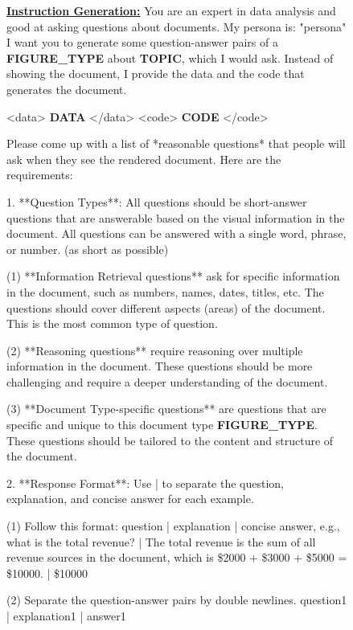 \begin{figure}[!h]
    \centering
    \begin{center}

\begin{tcolorbox} [top=3pt,bottom=3pt, left=3pt, right=3pt, width=\linewidth, boxrule=1pt]
    {\scriptsize {\selectfont    
    \underline{\textbf{Instruction Generation:}}
    You are an expert in data analysis and good at asking questions about documents.
My persona is: "{persona}"
I want you to generate some question-answer pairs of a \textbf{FIGURE\_TYPE} about \textbf{TOPIC}, which I would ask.
Instead of showing the document, I provide the data and the code that generates the document.

<data>
\textbf{DATA}
</data>
<code>
\textbf{CODE}
</code>

Please come up with a list of *reasonable questions* that people will ask when they see the rendered document. Here are the requirements:

1. **Question Types**: All questions should be short-answer questions that are answerable based on the visual information in the document. All questions can be answered with a single word, phrase, or number. (as short as possible)

    (1) **Information Retrieval questions** ask for specific information in the document, such as numbers, names, dates, titles, etc. The questions should cover different aspects (areas) of the document. This is the most common type of question.
    
    (2) **Reasoning questions** require reasoning over multiple information in the document. These questions should be more challenging and require a deeper understanding of the document.
    
    (3) **Document Type-specific questions** are questions that are specific and unique to this document type \textbf{FIGURE\_TYPE}. These questions should be tailored to the content and structure of the document.

2. **Response Format**: Use | to separate the question, explanation, and concise answer for each example. 

    (1) Follow this format: question | explanation | concise answer, e.g., what is the total revenue? | The total revenue is the sum of all revenue sources in the document, which is \$2000 + \$3000 + \$5000 = \$10000. | \$10000 
    
    (2) Separate the question-answer pairs by double newlines. 
    question1 | explanation1 | answer1 
    
}}
\end{tcolorbox}
\end{center}
\end{figure}
